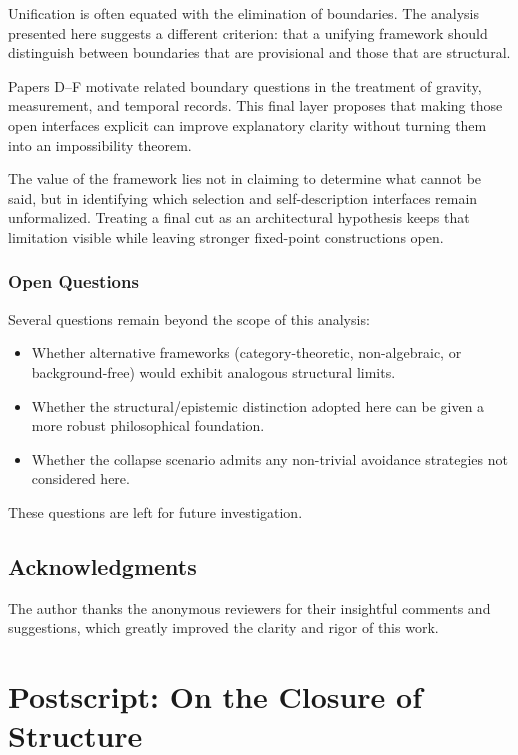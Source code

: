 \documentclass[12pt,a4paper,openany]{book}
\begin{document}
Unification is often equated with the elimination of boundaries. The analysis presented here suggests a different criterion: that a unifying framework should distinguish between boundaries that are provisional and those that are structural.

Papers D--F motivate related boundary questions in the treatment of gravity, measurement, and temporal records. This final layer proposes that making those open interfaces explicit can improve explanatory clarity without turning them into an impossibility theorem.

The value of the framework lies not in claiming to determine what cannot be said, but in identifying which selection and self-description interfaces remain unformalized. Treating a final cut as an architectural hypothesis keeps that limitation visible while leaving stronger fixed-point constructions open.

\subsection{Open Questions}

Several questions remain beyond the scope of this analysis:

\begin{itemize}
    \item Whether alternative frameworks (category-theoretic, non-algebraic, or background-free) would exhibit analogous structural limits.
    \item Whether the structural/epistemic distinction adopted here can be given a more robust philosophical foundation.
    \item Whether the collapse scenario admits any non-trivial avoidance strategies not considered here.
\end{itemize}

These questions are left for future investigation.

\section*{Acknowledgments}

The author thanks the anonymous reviewers for their insightful comments and suggestions, which greatly improved the clarity and rigor of this work.

\chapter{Postscript: On the Closure of Structure}
\label{H-chap:postscript}
\end{document}
